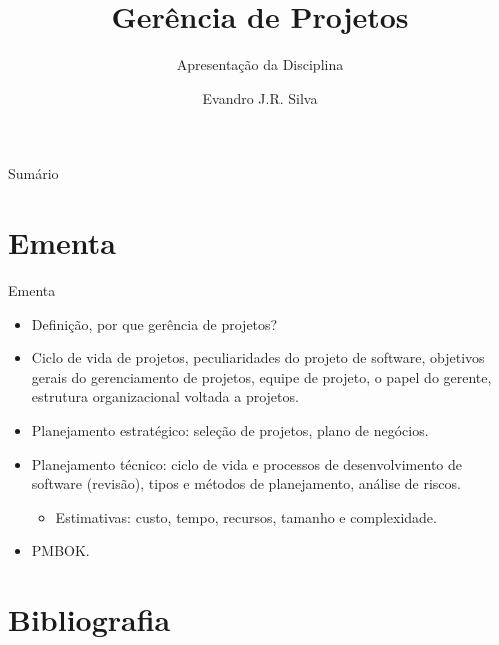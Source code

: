 \documentclass{beamer}
\title[GP 00]{Gerência de Projetos}
\subtitle{Apresentação da Disciplina}
\author[E.J.R. Silva]{Evandro J.R. Silva}
\date{}
\begin{document}
    
\begin{frame}
    \titlepage
\end{frame}

\begin{frame}{Sumário}
    \tableofcontents
\end{frame}

\section{Ementa}

\begin{frame}{Ementa}
    \begin{itemize}
        \justifying
        \item Definição, por que gerência de projetos?
        \item Ciclo de vida de projetos, peculiaridades do projeto de software, objetivos gerais do gerenciamento de projetos, equipe de projeto, o papel do gerente, estrutura organizacional voltada a projetos.
        \item Planejamento estratégico: seleção de projetos, plano de negócios.
        \item Planejamento técnico: ciclo de vida e processos de desenvolvimento de software (revisão), tipos e métodos de planejamento, análise de riscos.
            \begin{itemize}
                \item Estimativas: custo, tempo, recursos, tamanho e complexidade.
            \end{itemize}
        \item PMBOK.
    \end{itemize}
\end{frame}


\section{Bibliografia}
\end{document}

